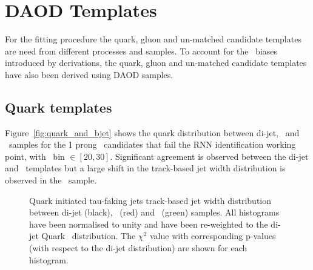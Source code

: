 	\section{DAOD Templates}
	\label{sec:DAODtemplates}
	For the fitting procedure the quark, gluon and un-matched candidate templates are need from different processes and samples. 
	To account for the \htau\ biases introduced by derivations, the quark, gluon and un-matched candidate templates have also been derived using \ac{DAOD} samples.   
	\subsection{Quark templates}
	\label{subsec:FTTFquark}
	Figure~\ref{fig:quark_and_bjet} shows the quark distribution between di-jet,  \Zjets\ and \ttbar\ samples for the 1 prong \htau\ candidates that fail the \ac{RNN} identification working point, with \pt\ bin $\in[20,30]$. 
	Significant agreement is observed between the di-jet and \Zjets\ templates but a large shift in the track-based jet width distribution is observed in the \ttbar\ sample.
	\begin{figure}[!hbt]
	\begin{center}
	\hspace{0.0\textwidth}
	\hspace{0.0\textwidth}
	\end{center}
	\caption{Quark initiated tau-faking jets track-based jet width distribution between di-jet (black), \Zjets\ (red) and \ttbar\ (green) samples. All histograms have been normalised to unity and have been re-weighted to the di-jet Quark \pt\ distribution. The $\chi^2$ value with corresponding p-values (with respect to the di-jet distribution) are shown for each histogram.}
\end{figure}				
	
